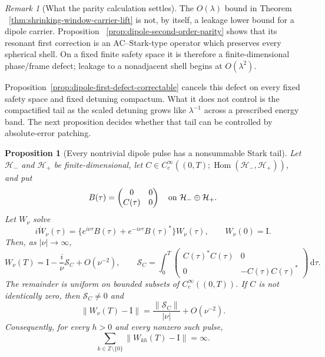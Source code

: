 \documentclass[11pt]{article}
\newtheorem{proposition}[theorem]{Proposition}
\theoremstyle{remark}
\newtheorem{remark}[theorem]{Remark}
\newcommand{\Id}{\mathrm I}
\newcommand{\dd}{\,\mathrm d}
\begin{document}
\begin{remark}[What the parity calculation settles]
\label{rem:dipole-stark-only-first-defect}
The $O(\lambda)$ bound in Theorem
~\ref{thm:shrinking-window-carrier-lift} is not, by itself, a leakage lower
bound for a dipole carrier.  Proposition
~\ref{prop:dipole-second-order-parity} shows that its resonant first correction
is an AC--Stark-type operator which preserves every spherical shell.  On a
fixed finite safety space it is therefore a finite-dimensional phase/frame
defect; leakage to a nonadjacent shell begins at $O(\lambda^2)$.

Proposition~\ref{prop:dipole-first-defect-correctable} cancels this defect on
every fixed safety space and fixed detuning compactum.  What it does not
control is the compactified tail as the scaled detuning grows like
$\lambda^{-1}$ across a prescribed energy band.  The next proposition
decides whether that tail can be controlled by absolute-error patching.
\end{remark}

\begin{proposition}[Every nontrivial dipole pulse has a nonsummable Stark tail]
\label{prop:dipole-unavoidable-one-over-nu-tail}
Let $\mathcal H_-$ and $\mathcal H_+$ be finite-dimensional, let
$C\in C_c^\infty((0,T);
\operatorname{Hom}(\mathcal H_-,\mathcal H_+))$, and put
\[
 B(\tau)=
 \begin{pmatrix}0&0\\ C(\tau)&0\end{pmatrix}
 \quad\hbox{on }\mathcal H_-\oplus\mathcal H_+.
\]
Let $W_\nu$ solve
\begin{equation}
 i\dot W_\nu(\tau)
 =
 \{e^{i\nu\tau}B(\tau)+e^{-i\nu\tau}B(\tau)^*\}W_\nu(\tau),
 \qquad W_\nu(0)=\Id.
 \label{eq:far-detuned-dipole-system}
\end{equation}
Then, as $|\nu|\to\infty$,
\begin{equation}
 W_\nu(T)
 =
 \Id-\frac{i}{\nu}\mathcal S_C+O(\nu^{-2}),
 \qquad
 \mathcal S_C=
 \int_0^T
 \begin{pmatrix}
 C(\tau)^*C(\tau)&0\\
 0&-C(\tau)C(\tau)^*
 \end{pmatrix}\dd\tau .
 \label{eq:unavoidable-stark-tail}
\end{equation}
The remainder is uniform on bounded subsets of
$C_c^\infty((0,T))$.  If $C$ is not identically zero, then
$\mathcal S_C\neq0$ and
\begin{equation}
 \|W_\nu(T)-\Id\|
 =\frac{\|\mathcal S_C\|}{|\nu|}+O(\nu^{-2}).
 \label{eq:sharp-one-over-detuning-tail}
\end{equation}
Consequently, for every $h>0$ and every nonzero such pulse,
\begin{equation}
 \sum_{k\in\mathbb Z\setminus\{0\}}
 \|W_{kh}(T)-\Id\|=\infty .
 \label{eq:dipole-tail-not-ell-one}
\end{equation}
\end{proposition}
\end{document}
